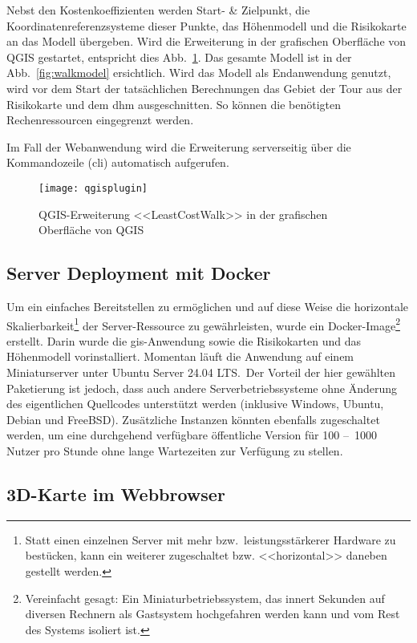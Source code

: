 Nebst den Kostenkoeffizienten werden Start- \& Zielpunkt, die Koordinatenreferenzsysteme dieser Punkte, das Höhenmodell und die Risikokarte an das Modell übergeben. Wird die Erweiterung in der grafischen Oberfläche von QGIS gestartet, entspricht dies Abb.\ \ref{fig:qgisplugin}. Das gesamte Modell ist in der Abb.\ \ref{fig:walkmodel} ersichtlich. Wird das Modell als Endanwendung genutzt, wird vor dem Start der tatsächlichen Berechnungen das Gebiet der Tour aus der Risikokarte und dem \acrshort{dhm} ausgeschnitten. So können die benötigten Rechenressourcen eingegrenzt werden.

Im Fall der Webanwendung wird die Erweiterung serverseitig über die Kommandozeile (\acrshort{cli}) automatisch aufgerufen.

\begin{figure}[H]
  \centering
  \texttt{[image: qgisplugin]}
  \caption{QGIS-Erweiterung <<LeastCostWalk>> in der grafischen Oberfläche von QGIS}\label{fig:qgisplugin}
\end{figure}

\subsection{Server Deployment mit Docker}

Um ein einfaches Bereitstellen zu ermöglichen und auf diese Weise die horizontale Skalierbarkeit\footnote{Statt einen einzelnen Server mit mehr bzw.\ leistungsstärkerer Hardware zu bestücken, kann ein weiterer zugeschaltet bzw. <<horizontal>> daneben gestellt werden.} der Server-Ressource zu gewährleisten, wurde ein Docker-Image\footnote{Vereinfacht gesagt: Ein Miniaturbetriebssystem, das innert Sekunden auf diversen Rechnern als Gastsystem hochgefahren werden kann und vom Rest des Systems isoliert ist.} erstellt. Darin wurde die \gls{gis}-Anwendung sowie die Risikokarten und das Höhenmodell vorinstalliert. Momentan läuft die Anwendung auf einem Miniaturserver unter Ubuntu Server 24.04 LTS.\ Der Vorteil der hier gewählten Paketierung ist jedoch, dass auch andere Serverbetriebssysteme ohne Änderung des eigentlichen Quellcodes unterstützt werden (inklusive Windows, Ubuntu, Debian und FreeBSD). Zusätzliche Instanzen könnten ebenfalls zugeschaltet werden, um eine durchgehend verfügbare öffentliche Version für 100 --~1000 Nutzer pro Stunde ohne lange Wartezeiten zur Verfügung zu stellen.

\subsection{3D-Karte im Webbrowser}

